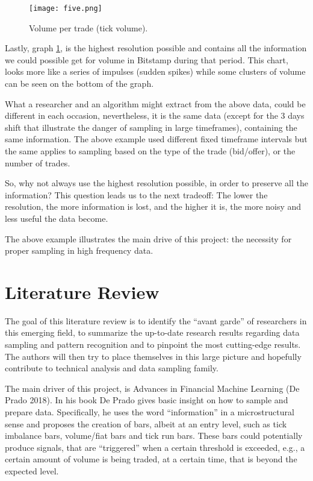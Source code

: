 \begin{figure}[h]
    \centering
    \texttt{[image: five.png]}
    \caption{Volume per trade (tick volume).}
    \label{fig:tick_vol}
\end{figure}

Lastly, graph \ref{fig:tick_vol}, is the highest resolution possible and contains all the information we could possible get for volume in Bitstamp during that period. This chart, looks more like a series of impulses (sudden spikes) while some clusters of volume can be seen on the bottom of the graph. 

What a researcher and an algorithm might extract from the above data, could be different in
each occasion, nevertheless, it is the same data (except for the 3 days shift that illustrate the danger of sampling in large timeframes), containing the same information. The above example used different fixed timeframe intervals but the same applies to sampling based on the type of the trade (bid/offer), or the number of trades. 

So, why not always use the highest resolution possible, in order to preserve all the information? This question leads us to the next tradeoff: The lower the resolution, the more information is lost, and the higher it is, the more noisy and less useful the data become.

The above example illustrates the main drive of this project: the necessity for proper sampling in high frequency data.


\section{Literature Review}

The goal of this literature review is to identify the “avant garde” of researchers in this
emerging field, to summarize the up-to-date research results regarding data sampling and
pattern recognition and to pinpoint the most cutting-edge results. The authors will then try to
place themselves in this large picture and hopefully contribute to technical analysis and data
sampling family.

The main driver of this project, is Advances in Financial Machine Learning (De Prado
2018). In his book De Prado gives basic insight on how to sample and prepare data. Specifically,
he uses the word “information” in a microstructural sense and proposes the creation of bars,
albeit at an entry level, such as tick imbalance bars, volume/fiat bars and tick run bars. These
bars could potentially produce signals, that are “triggered” when a certain threshold is
exceeded, e.g., a certain amount of volume is being traded, at a certain time, that is beyond the
expected level.

